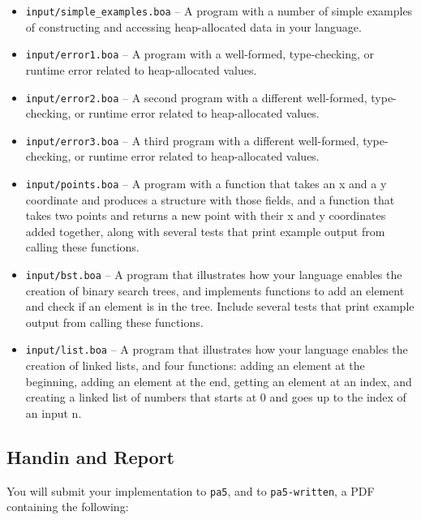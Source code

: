 \documentclass[10pt, oneside]{article}
\begin{document}
\begin{itemize}

\item {\tt input/simple\_examples.boa} -- A program with a number of simple
examples of constructing and accessing heap-allocated data in your language.

\item {\tt input/error1.boa} -- A program with a well-formed, type-checking,
or runtime error related to heap-allocated values.

\item {\tt input/error2.boa} -- A second program with a different
well-formed, type-checking, or runtime error related to heap-allocated
values.

\item {\tt input/error3.boa} -- A third program with a different well-formed,
type-checking, or runtime error related to heap-allocated values.

\item {\tt input/points.boa} -- A program with a function that takes an x and
a y coordinate and produces a structure with those fields, and a function
that takes two points and returns a new point with their x and y coordinates
added together, along with several tests that print example output from
calling these functions.

\item {\tt input/bst.boa} -- A program that illustrates how your language
enables the creation of binary search trees, and implements functions to add
an element and check if an element is in the tree. Include several tests that
print example output from calling these functions.

\item {\tt input/list.boa} -- A program that illustrates how your language
enables the creation of linked lists, and four functions: adding an element
at the beginning, adding an element at the end, getting an element at an
index, and creating a linked list of numbers that starts at 0 and goes up to
the index of an input n.

\end{itemize}

\subsection*{Handin and Report}

You will submit your implementation to {\tt pa5}, and to {\tt pa5-written}, a
PDF containing the following:
\end{document}
